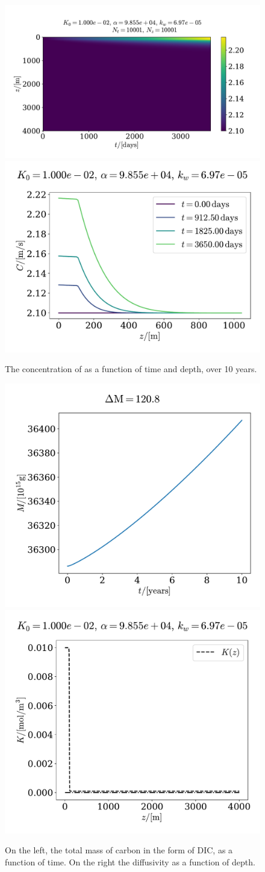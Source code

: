 \documentclass{article}
\begin{document}
    \begin{figure}[H]
        \centering
        \includegraphics[width=.56\textwidth]{../plots/prob3}
        \includegraphics[width=.43\textwidth]{../plots/prob3_i}
        \caption{The concentration of   as a function of time and depth, over 10 years.}
        \label{prob3}
    \end{figure}

    \begin{figure}[H]
        \centering
        \includegraphics[width=.45\textwidth]{../plots/prob3_M}
        \includegraphics[width=.45\textwidth]{../plots/prob3_K}
        \caption{On the left, the total mass of carbon in the form of DIC, as a function of time.
        On the right the diffusivity as a function of depth.}
        \label{prob3 mass}
    \end{figure}
\end{document}
